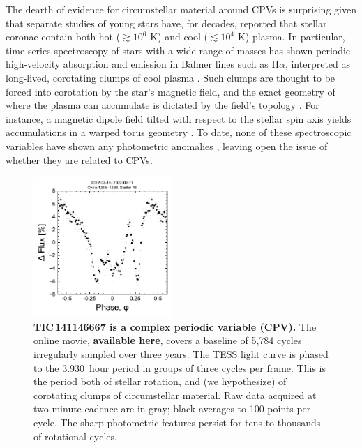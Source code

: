 \documentclass[11pt,twocolumn,tighten,linenumbers]{aastex7}
\newcommand{\periodhr}{3.930}
\begin{document}
The dearth of evidence for circumstellar material around CPVs is
surprising given that separate studies of young stars have, for
decades, reported that stellar coronae contain both hot
($\gtrsim$$10^6$ K) and cool ($\lesssim$$10^4$ K) plasma. In
particular, time-series spectroscopy of stars with a wide range of
masses has shown periodic high-velocity absorption and emission in
Balmer lines such as H$\alpha$, interpreted as long-lived, corotating
clumps of cool plasma
\citep{CollierCameron1989,CollierCameron1992,Barnes2000,Donati2000,Dunstone2006,Skelly2008,Leitzinger2016,Cang2021}.
Such clumps are thought to be forced into corotation by the star's
magnetic field, and the exact geometry of where the plasma can
accumulate is dictated by the field's topology \citep{Waugh2022}.  For
instance, a magnetic dipole field tilted with respect to the stellar
spin axis yields accumulations in a warped torus geometry
\citep{Townsend2005}.  To date, none of these spectroscopic variables
have shown any photometric anomalies \citep{Bouma2024}, leaving open
the issue of whether they are related to CPVs.

\begin{figure}[!t]
  \centering
  \includegraphics[width=0.47\textwidth]{f1.pdf}
  \vspace{-0.4cm}
  \captionsetup{labelformat=moviefmt,labelsep=colon}
	\caption{\textbf{TIC\,141146667 is a complex periodic variable (CPV).}  The
online movie,
  \href{https://lgbouma.com/movies/TIC141146667_20250116.mp4}{{\bf
  available here}},
  covers a baseline of 5{,}784 cycles irregularly sampled over three
  years.  The TESS light curve is phased to the \periodhr\ hour period
  in groups of three cycles per frame.  This is the period both of
  stellar rotation, and (we hypothesize) of corotating clumps of
  circumstellar material.  Raw data acquired at two minute cadence
  are in gray; black averages to 100 points per cycle.  
  The sharp photometric features persist
  for tens to thousands of rotational cycles. }
  \label{fig:lc}
\end{figure}
\end{document}
